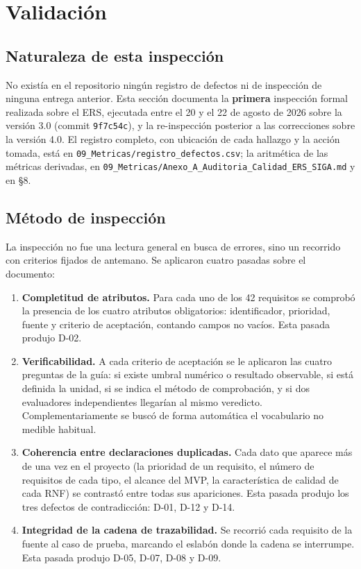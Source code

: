 \section{Validaci\'on}

\subsection{Naturaleza de esta inspecci\'on}

No exist\'ia en el repositorio ning\'un registro de defectos ni de inspecci\'on de ninguna entrega anterior. Esta secci\'on documenta la \textbf{primera} inspecci\'on formal realizada sobre el ERS, ejecutada entre el 20 y el 22 de agosto de 2026 sobre la versi\'on 3.0 (commit \texttt{9f7c54c}), y la re-inspecci\'on posterior a las correcciones sobre la versi\'on 4.0. El registro completo, con ubicaci\'on de cada hallazgo y la acci\'on tomada, est\'a en \texttt{09\_Metricas/registro\_defectos.csv}; la aritm\'etica de las m\'etricas derivadas, en \texttt{09\_Metricas/Anexo\_A\_Auditoria\_Calidad\_ERS\_SIGA.md} y en \S8.

\subsection{M\'etodo de inspecci\'on}

La inspecci\'on no fue una lectura general en busca de errores, sino un recorrido con criterios fijados de antemano. Se aplicaron cuatro pasadas sobre el documento:

\begin{enumerate}
\item \textbf{Completitud de atributos.} Para cada uno de los 42 requisitos se comprob\'o la presencia de los cuatro atributos obligatorios: identificador, prioridad, fuente y criterio de aceptaci\'on, contando campos no vac\'ios. Esta pasada produjo D-02.
\item \textbf{Verificabilidad.} A cada criterio de aceptaci\'on se le aplicaron las cuatro preguntas de la gu\'ia: si existe umbral num\'erico o resultado observable, si est\'a definida la unidad, si se indica el m\'etodo de comprobaci\'on, y si dos evaluadores independientes llegar\'ian al mismo veredicto. Complementariamente se busc\'o de forma autom\'atica el vocabulario no medible habitual.
\item \textbf{Coherencia entre declaraciones duplicadas.} Cada dato que aparece m\'as de una vez en el proyecto (la prioridad de un requisito, el n\'umero de requisitos de cada tipo, el alcance del MVP, la caracter\'istica de calidad de cada RNF) se contrast\'o entre todas sus apariciones. Esta pasada produjo los tres defectos de contradicci\'on: D-01, D-12 y D-14.
\item \textbf{Integridad de la cadena de trazabilidad.} Se recorri\'o cada requisito de la fuente al caso de prueba, marcando el eslab\'on donde la cadena se interrumpe. Esta pasada produjo D-05, D-07, D-08 y D-09.
\end{enumerate}

